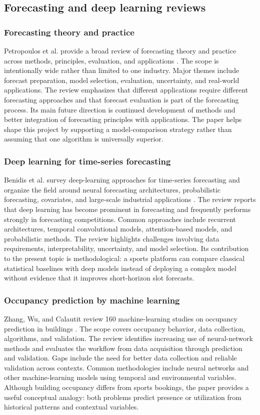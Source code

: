 \subsection{Forecasting and deep learning reviews}

\subsubsection{Forecasting theory and practice}
Petropoulos et al. provide a broad review of forecasting theory and practice across methods, principles, evaluation, and applications \cite{r15}. The scope is intentionally wide rather than limited to one industry. Major themes include forecast preparation, model selection, evaluation, uncertainty, and real-world applications. The review emphasizes that different applications require different forecasting approaches and that forecast evaluation is part of the forecasting process. Its main future direction is continued development of methods and better integration of forecasting principles with applications. The paper helps shape this project by supporting a model-comparison strategy rather than assuming that one algorithm is universally superior.

\subsubsection{Deep learning for time-series forecasting}
Benidis et al. survey deep-learning approaches for time-series forecasting and organize the field around neural forecasting architectures, probabilistic forecasting, covariates, and large-scale industrial applications \cite{r16}. The review reports that deep learning has become prominent in forecasting and frequently performs strongly in forecasting competitions. Common approaches include recurrent architectures, temporal convolutional models, attention-based models, and probabilistic methods. The review highlights challenges involving data requirements, interpretability, uncertainty, and model selection. Its contribution to the present topic is methodological: a sports platform can compare classical statistical baselines with deep models instead of deploying a complex model without evidence that it improves short-horizon slot forecasts.

\subsubsection{Occupancy prediction by machine learning}
Zhang, Wu, and Calautit review 160 machine-learning studies on occupancy prediction in buildings \cite{r17}. The scope covers occupancy behavior, data collection, algorithms, and validation. The review identifies increasing use of neural-network methods and evaluates the workflow from data acquisition through prediction and validation. Gaps include the need for better data collection and reliable validation across contexts. Common methodologies include neural networks and other machine-learning models using temporal and environmental variables. Although building occupancy differs from sports bookings, the paper provides a useful conceptual analogy: both problems predict presence or utilization from historical patterns and contextual variables.

